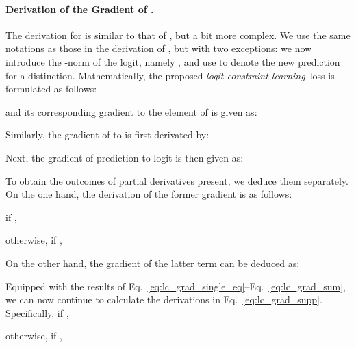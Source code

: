 \documentclass[letterpaper]{article} \usepackage{aaai23}  \usepackage{times}  \usepackage{helvet}  \usepackage{courier}  \usepackage[hyphens]{url}  \usepackage{graphicx} \urlstyle{rm} \def\UrlFont{\rm}  \usepackage{natbib}  \usepackage{caption} \frenchspacing  \setlength{\pdfpagewidth}{8.5in}  \setlength{\pdfpageheight}{11in}  \usepackage{algorithm}
\newcommand{\lossModuleName}{\textit{logit-constraint learning}}
\begin{document}
\paragraph{Derivation of the Gradient of .}
The derivation for  is similar to that of , but a bit more complex. We use the same notations as those in the derivation of , but with two exceptions: we now introduce the -norm of the logit, namely , and use  to denote the new prediction for a distinction. Mathematically, the proposed \lossModuleName~loss is formulated as follows:
\begin{small}
  
\end{small}and its corresponding gradient to the  element of  is given as:
\begin{small}
  
\end{small}Similarly, the gradient of  to  is first derivated by:
\begin{small}
  
\end{small}Next, the gradient of prediction to logit is then given as:
\begin{small}
  
\end{small}To obtain the outcomes of partial derivatives present, we deduce them separately.
On the one hand, the derivation of the former gradient is as follows:
\begin{small}
  
\end{small}if ,
\begin{small}
  
\end{small}otherwise, if ,
\begin{small}
  
\end{small}On the other hand, the gradient of the latter term can be deduced as:
\begin{small}
  
\end{small}Equipped with the results of Eq.~\eqref{eq:lc_grad_single_eq}--Eq.~\eqref{eq:lc_grad_sum}, we can now continue to calculate the derivations in Eq.~\eqref{eq:lc_grad_supp}. Specifically, if ,
\begin{small}
  
\end{small}otherwise, if ,
\begin{small}
  
\end{small}
\end{document}
